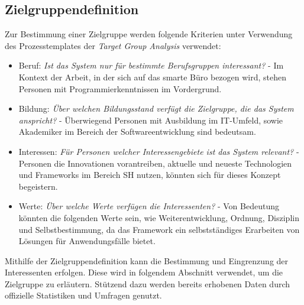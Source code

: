    \subsection{Zielgruppendefinition}
    \label{subsec:zielgruppendefinition}
        Zur Bestimmung einer Zielgruppe werden folgende Kriterien unter Verwendung des Prozesstemplates der \textit{Target Group Analysis} verwendet:  
        \begin{itemize}
            \item Beruf: \textit{Ist das System nur für bestimmte Berufsgruppen interessant?} - Im Kontext der Arbeit, in der sich auf das smarte Büro bezogen wird, stehen Personen mit Programmierkenntnissen im Vordergrund. 
            \item Bildung: \textit{Über welchen Bildungsstand verfügt die Zielgruppe, die das System anspricht?} - Überwiegend Personen mit Ausbildung im IT-Umfeld, sowie Akademiker im Bereich der Softwareentwicklung sind bedeutsam.
            \item Interessen: \textit{Für Personen welcher Interessengebiete ist das System relevant?} -  Personen die Innovationen vorantreiben, aktuelle und neueste Technologien und Frameworks im Bereich \acs{SH} nutzen, könnten sich für dieses Konzept begeistern.
            \item Werte: \textit{Über welche Werte verfügen die Interessenten?} - Von Bedeutung könnten die folgenden Werte sein, wie Weiterentwicklung, Ordnung, Disziplin und Selbstbestimmung, da das Framework ein selbstständiges Erarbeiten von Lösungen für Anwendungsfälle bietet. 
        \end{itemize} 
        Mithilfe der Zielgruppendefinition kann die Bestimmung und Eingrenzung der Interessenten erfolgen. Diese wird in 
        folgendem Abschnitt verwendet, um die Zielgruppe zu erläutern. Stützend dazu werden bereits erhobenen Daten durch offizielle 
        Statistiken und Umfragen genutzt.     

